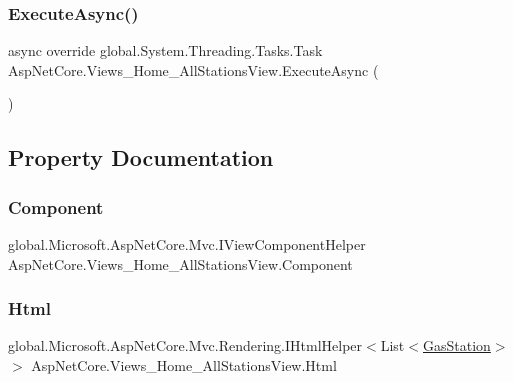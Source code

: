 \subsubsection{\texorpdfstring{ExecuteAsync()}{ExecuteAsync()}}
{\footnotesize\ttfamily async override global.\+System.\+Threading.\+Tasks.\+Task Asp\+Net\+Core.\+Views\+\_\+\+Home\+\_\+\+All\+Stations\+View.\+Execute\+Async (\begin{DoxyParamCaption}{ }\end{DoxyParamCaption})}



\subsection{Property Documentation}
\mbox{\label{class_asp_net_core_1_1_views___home___all_stations_view_aa0ec138c7d2b5652b89157bd26a92185}} 
\subsubsection{\texorpdfstring{Component}{Component}}
{\footnotesize\ttfamily global.\+Microsoft.\+Asp\+Net\+Core.\+Mvc.\+I\+View\+Component\+Helper Asp\+Net\+Core.\+Views\+\_\+\+Home\+\_\+\+All\+Stations\+View.\+Component\hspace{0.3cm}{\ttfamily [get]}}

\mbox{\label{class_asp_net_core_1_1_views___home___all_stations_view_a51ab38eddcf5b2aef5e28f0501032d7b}} 
\subsubsection{\texorpdfstring{Html}{Html}}
{\footnotesize\ttfamily global.\+Microsoft.\+Asp\+Net\+Core.\+Mvc.\+Rendering.\+I\+Html\+Helper$<$List$<$\mbox{\hyperlink{class_gasoline_1_1_data_1_1_models_1_1_gas_station}{Gas\+Station}}$>$ $>$ Asp\+Net\+Core.\+Views\+\_\+\+Home\+\_\+\+All\+Stations\+View.\+Html\hspace{0.3cm}{\ttfamily [get]}}

